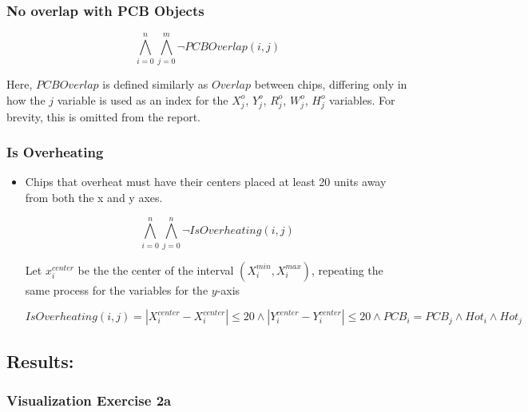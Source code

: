        \subsubsection{No overlap with PCB Objects}

            \[
                \bigwedge_{i=0}^{n}\bigwedge_{j=0}^{m} \lnot PCBOverlap(i, j)
            \]

            Here, $PCBOverlap$ is defined similarly as $Overlap$ between chips,
            differing only in how the $j$ variable is used as an index for the
            $X_j^o$, $Y_j^o$, $R_j^o$, $W_j^o$, $H_j^o$ variables. For brevity,
            this is omitted from the report.

        \subsubsection{Is Overheating}

            \begin{itemize}
                \item 
                Chips that overheat must have their centers placed at least 20
                units away from both the x and y axes.
                
                $$
                \bigwedge_{i=0}^{n}\bigwedge_{j=0}^{n} \lnot IsOverheating(i,j)
                $$

                Let $x_i^{center}$ be the the center of the interval
                $(X_i^{min}, X_i^{max})$, repeating the same process for the
                variables for the $y$-axis 

                \[
                IsOverheating(i,j) = |X_i^{center}-X_i^{center}| \leq 20 \land
                |Y_i^{center}-Y_i^{center}| \leq 20 \land PCB_i = PCB_j \land
                Hot_i \land Hot_j
                \]
            \end{itemize}

    \subsection{Results:}

        \subsubsection{Visualization Exercise 2a}

